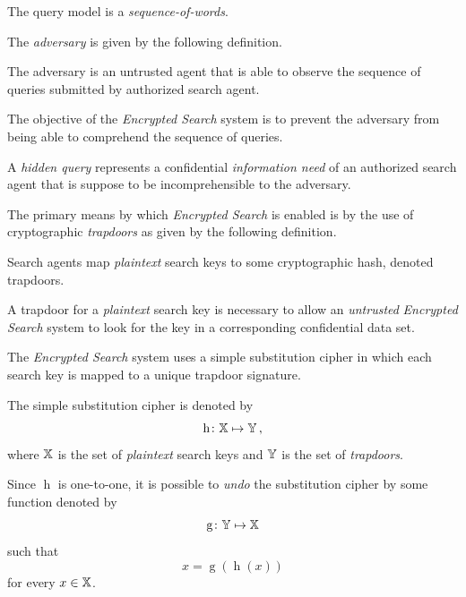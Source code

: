 \documentclass[final,
  11pt,
]{article}
\begin{document}
\begin{assumption}
The query model is a \emph{sequence-of-words}.
\end{assumption}

The \emph{adversary} is given by the following definition.

\begin{definition}
The adversary is an untrusted agent that is able to observe the sequence of
queries submitted by authorized search agent.
\end{definition}

The objective of the \emph{Encrypted Search} system is to prevent the
adversary from being able to comprehend the sequence of queries.

\begin{definition}
A \emph{hidden query} represents a confidential \emph{information need} of an
authorized search agent that is suppose to be incomprehensible to the adversary.
\end{definition}

The primary means by which \emph{Encrypted Search} is enabled is by the
use of cryptographic \emph{trapdoors} as given by the following
definition.

\begin{definition}[Trapdoor]
Search agents map \emph{plaintext} search keys to some cryptographic hash,
denoted trapdoors.
\end{definition}

A trapdoor for a \emph{plaintext} search key is necessary to allow an
\emph{untrusted} \emph{Encrypted Search} system to look for the key in a
corresponding confidential data set.

\begin{assumption}
The \emph{Encrypted Search} system uses a simple substitution cipher in which
each search key is mapped to a unique trapdoor signature.
\end{assumption}

The simple substitution cipher is denoted by \begin{equation}
    \operatorname{h} \colon \mathbb{X} \mapsto \mathbb{Y}\,,
\end{equation} where \(\mathbb{X}\) is the set of \emph{plaintext} search
keys and \(\mathbb{Y}\) is the set of \emph{trapdoors}.

Since \(\operatorname{h}\) is one-to-one, it is possible to \emph{undo}
the substitution cipher by some function denoted by \begin{equation}
    \operatorname{g} \colon \mathbb{Y} \mapsto \mathbb{X}
\end{equation} such that \[
    x = \operatorname{g}(\operatorname{h}(x))
\] for every \(x \in \mathbb{X}\).
\end{document}
